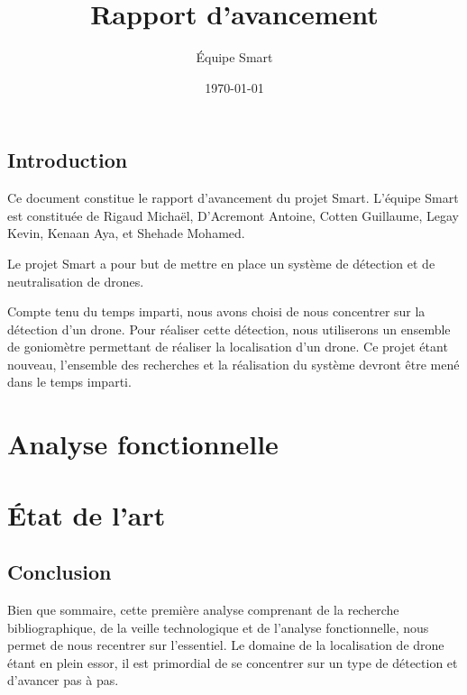 \documentclass[a4paper, 11pt, oneside]{memoir}
\title{Rapport d'avancement}
\author{Équipe Smart}
\date{\today}
\newcounter{rem}[chapter]
\newcounter{th}[chapter]
\begin{document}
\nocite{*}


\maketitle
\thispagestyle{empty}
\newpage

\tableofcontents

\newpage

\chapter*{Introduction}

Ce document constitue le rapport d'avancement du projet Smart.
L'équipe Smart est constituée de Rigaud Michaël, D'Acremont Antoine, Cotten Guillaume, Legay Kevin, Kenaan Aya, et Shehade Mohamed.

Le projet Smart a pour but de mettre en place un système de détection et de neutralisation de drones.

Compte tenu du temps imparti, nous avons choisi de nous concentrer sur la détection d'un drone. Pour réaliser cette détection, nous utiliserons un ensemble de goniomètre permettant de réaliser la localisation d'un drone. Ce projet étant nouveau, l'ensemble des recherches et la réalisation du système devront être mené dans le temps imparti.




\newpage


\part{Analyse fonctionnelle}



\part{État de l'art}





\chapter*{Conclusion}
Bien que sommaire, cette première analyse comprenant de la recherche bibliographique, de la veille technologique et de l'analyse fonctionnelle, nous permet de nous recentrer sur l'essentiel. Le domaine de la localisation de drone étant en plein essor, il est primordial de se concentrer sur un type de détection et d'avancer pas à pas.
\end{document}
